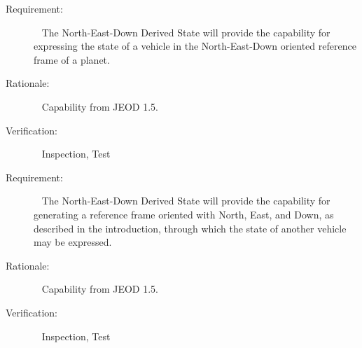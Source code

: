 
%
%
% 
%

\label{reqt:NED}
\begin{description}
  \item[Requirement:]\ \newline
     The North-East-Down Derived State will provide the capability for expressing the state of a vehicle in the North-East-Down oriented reference frame of a planet.
  \item[Rationale:]\ \newline
     Capability from JEOD 1.5.
  \item[Verification:]\ \newline
     Inspection, Test
\end{description}

\label{reqt:NED_frame}
\begin{description}
  \item[Requirement:]\ \newline
     The North-East-Down Derived State will provide the capability for generating a reference frame oriented with North, East, and Down, as described in the introduction, through which the state of another vehicle may be expressed.
  \item[Rationale:]\ \newline
     Capability from JEOD 1.5.
  \item[Verification:]\ \newline
     Inspection, Test
\end{description}


